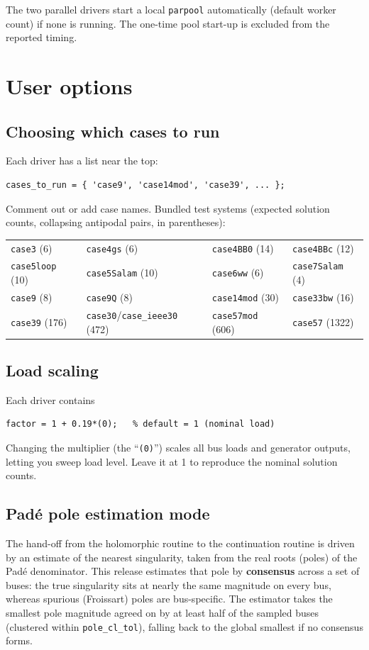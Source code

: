 \documentclass[11pt,a4paper]{article}
\newcommand{\code}[1]{\texttt{#1}}
\begin{document}
The two parallel drivers start a local \code{parpool} automatically (default worker
count) if none is running. The one-time pool start-up is excluded from the reported
timing.

\section{User options}

\subsection{Choosing which cases to run}
Each driver has a list near the top:
\begin{lstlisting}[style=mat]
cases_to_run = { 'case9', 'case14mod', 'case39', ... };
\end{lstlisting}
Comment out or add case names. Bundled test systems (expected solution counts, collapsing
antipodal pairs, in parentheses):

\begin{center}\small
\begin{tabular}{@{}llll@{}}
\toprule
\code{case3} (6) & \code{case4gs} (6) & \code{case4BB0} (14) & \code{case4BBc} (12)\\
\code{case5loop} (10) & \code{case5Salam} (10) & \code{case6ww} (6) & \code{case7Salam} (4)\\
\code{case9} (8) & \code{case9Q} (8) & \code{case14mod} (30) & \code{case33bw} (16)\\
\code{case39} (176) & \code{case30}/\code{case_ieee30} (472) & \code{case57mod} (606) & \code{case57} (1322)\\
\bottomrule
\end{tabular}
\end{center}

\subsection{Load scaling}
Each driver contains
\begin{lstlisting}[style=mat]
factor = 1 + 0.19*(0);   % default = 1 (nominal load)
\end{lstlisting}
Changing the multiplier (the ``\code{(0)}'') scales all bus loads and generator outputs,
letting you sweep load level. Leave it at 1 to reproduce the nominal solution counts.

\subsection{Pad\'e pole estimation mode}\label{sec:pole}
The hand-off from the holomorphic routine to the continuation routine is driven by an
estimate of the nearest singularity, taken from the real roots (poles) of the Pad\'e
denominator. This release estimates that pole by \textbf{consensus} across a set of
buses: the true singularity sits at nearly the same magnitude on every bus, whereas
spurious (Froissart) poles are bus-specific. The estimator takes the smallest pole
magnitude agreed on by at least half of the sampled buses (clustered within
\code{pole_cl_tol}), falling back to the global smallest if no consensus forms.
\end{document}
